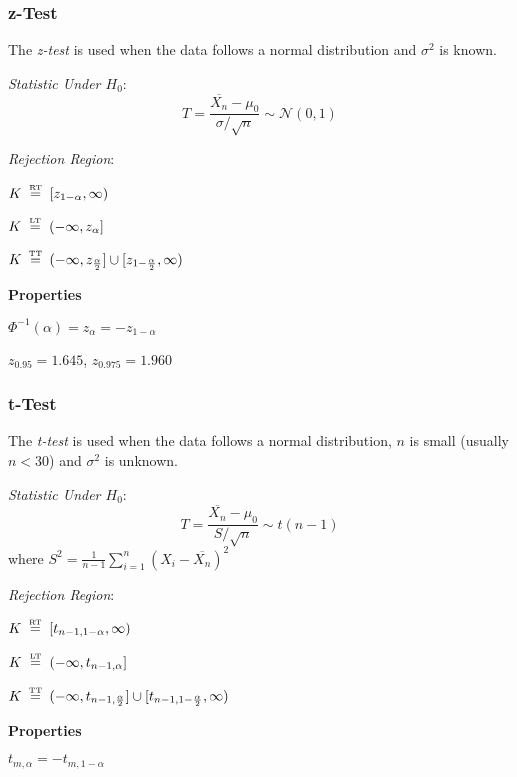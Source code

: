 \documentclass[8pt,a4paper]{extarticle}     %
\newcommand{\eqtxt}[1]{\mathrel{\stackrel{\makebox[0pt]{\mbox{\normalfont\tiny #1}}}{=}}}
\begin{document}
\begin{multicols}{4}
\subsubsection*{z-Test}
\begin{boxdefinition}[z-Test] 
	The \textit{z-test} is used when the data follows a normal distribution and $\sigma^2$ is known. 
	\begin{listnr}
		\item \textit{Statistic Under $H_0$}:
		\[
			T=\frac{\overline{X_n}-\mu_0}{\sigma/\sqrt{n}} \sim \mathcal{N}(0,1)
		\]
		\item \textit{Rejection Region}:
		\begin{listb}
			\item $K \ \eqtxt{RT} \	\left[z_{1-\alpha},\infty\right)$
			\item $K \ \eqtxt{LT} \ \left(-\infty, z_\alpha\right]$
			\item $K \ \eqtxt{TT} \ (-\infty, z_{\frac{\alpha}{2}}]\cup [z_{1-\frac{\alpha}{2}},\infty)$
		\end{listb}
	\end{listnr}	
\end{boxdefinition}
\begin{listb}
	\item [] \textbf{Properties}
	\item $\Phi^{-1}(\alpha)=z_\alpha=-z_{1-\alpha}$
	\item $z_{0.95}=1.645$, $z_{0.975}=1.960$
\end{listb}

\subsubsection*{t-Test}
\begin{boxdefinition}[t-Test] 
	The \textit{t-test} is used when the data follows a normal distribution, $n$ is small (usually $n<30$) and $\sigma^2$ is unknown. 
	\begin{listnr}
		\item \textit{Statistic Under $H_0$}:
		\[
			T=\frac{\overline{X_n}-\mu_0}{S/\sqrt{n}} \sim t(n-1)
		\]
		where $S^2=\frac{1}{n-1}\sum_{i=1}^{n}(X_i-\overline{X_n})^2$ 
		\item \textit{Rejection Region}:
		\begin{listb}
			\item $K \ \eqtxt{RT} \ \left[t_{n-1,1-\alpha},\infty\right)$
			\item $K \ \eqtxt{LT} \ \left(-\infty, t_{n-1,\alpha}\right]$
			\item $K \ \eqtxt{TT} \ (-\infty, t_{n-1,\frac{\alpha}{2}}]\cup [t_{n-1,1-\frac{\alpha}{2}},\infty)$
		\end{listb}
	\end{listnr}		
\end{boxdefinition}
\begin{listb}
	\item [] \textbf{Properties}
	\item $t_{m,\alpha}=-t_{m,1-\alpha}$
\end{listb}



\end{multicols}
\end{document}
